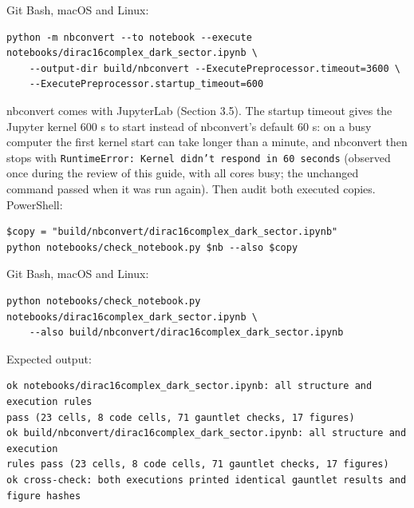 \documentclass[11pt]{article}
\begin{document}
Git Bash, macOS and Linux:

\begin{Verbatim}[fontsize=\small]
python -m nbconvert --to notebook --execute notebooks/dirac16complex_dark_sector.ipynb \
    --output-dir build/nbconvert --ExecutePreprocessor.timeout=3600 \
    --ExecutePreprocessor.startup_timeout=600
\end{Verbatim}

nbconvert comes with JupyterLab (Section 3.5). The startup timeout gives the Jupyter kernel 600 s to start instead of nbconvert's default 60 s: on a busy computer the first kernel start can take longer than a minute, and nbconvert then stops with \texttt{RuntimeE\allowbreak{}rror: Ke\allowbreak{}rnel did\allowbreak{}n't resp\allowbreak{}ond in 6\allowbreak{}0 second\allowbreak{}s} (observed once during the review of this guide, with all cores busy; the unchanged command passed when it was run again). Then audit both executed copies. PowerShell:

\begin{Verbatim}[fontsize=\small]
$copy = "build/nbconvert/dirac16complex_dark_sector.ipynb"
python notebooks/check_notebook.py $nb --also $copy
\end{Verbatim}

Git Bash, macOS and Linux:

\begin{Verbatim}[fontsize=\small]
python notebooks/check_notebook.py notebooks/dirac16complex_dark_sector.ipynb \
    --also build/nbconvert/dirac16complex_dark_sector.ipynb
\end{Verbatim}

Expected output:

\begin{Verbatim}[fontsize=\small]
ok notebooks/dirac16complex_dark_sector.ipynb: all structure and execution rules
pass (23 cells, 8 code cells, 71 gauntlet checks, 17 figures)
ok build/nbconvert/dirac16complex_dark_sector.ipynb: all structure and execution
rules pass (23 cells, 8 code cells, 71 gauntlet checks, 17 figures)
ok cross-check: both executions printed identical gauntlet results and figure hashes
\end{Verbatim}
\end{document}
